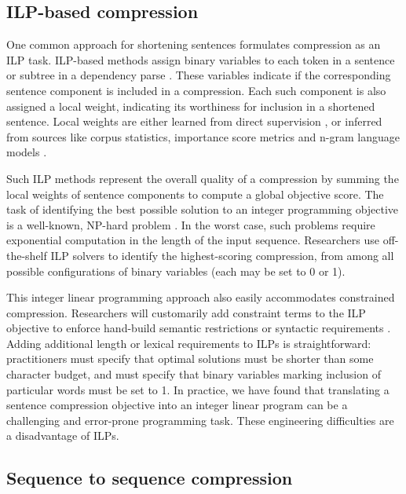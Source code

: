\documentclass[11pt,a4paper]{article}
\begin{document}
\subsection{ILP-based compression}\label{s:ilps}

One common approach for shortening sentences formulates compression as an ILP task. ILP-based methods assign binary variables to each token in a sentence \cite{clarke2008global} or subtree in a dependency parse \cite{filippova2008dependency}. These variables indicate if the corresponding sentence component is included in a compression. Each such component is also assigned a local weight, indicating its worthiness for inclusion in a shortened sentence. Local weights are either learned from direct supervision \cite{filippova2013overcoming,Wang2017CanSH}, or inferred from sources like corpus statistics, importance score metrics and n-gram language models \cite{clarke2008global,filippova2008dependency}.

Such ILP methods represent the overall quality of a compression by summing the local weights of sentence components to compute a global objective score.  The task of identifying the best possible solution to an integer programming objective is a well-known, NP-hard problem \cite{clarke2008global}. In the worst case, such problems require exponential computation in the length of the input sequence. Researchers use off-the-shelf ILP solvers to identify the highest-scoring compression, from among all possible configurations of binary variables (each may be set to 0 or 1). 

This integer linear programming approach also easily accommodates constrained compression. Researchers will customarily add constraint terms to the ILP objective to enforce hand-build semantic restrictions \cite{clarke2008global} or syntactic requirements \cite{filippova2008dependency}. Adding additional length or lexical requirements to ILPs is straightforward: practitioners must specify that optimal solutions must be shorter than some character budget, and must specify that binary variables marking inclusion of particular words must be set to 1. In practice, we have found that translating a sentence compression objective into an integer linear program can be a challenging and error-prone programming task. These engineering difficulties are a disadvantage of ILPs.

\subsection{Sequence to sequence compression}
\end{document}
